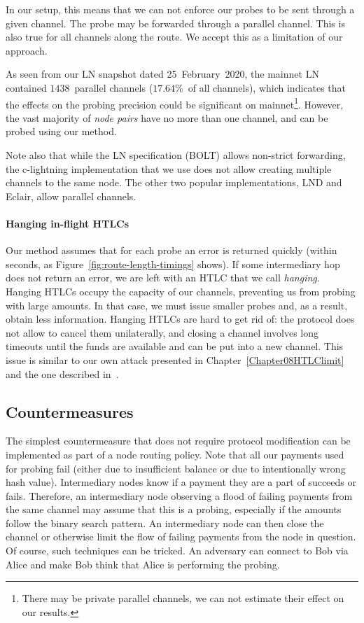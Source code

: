 In our setup, this means that we can not enforce our probes to be sent through a given channel.
The probe may be forwarded through a parallel channel.
This is also true for all channels along the route.
We accept this as a limitation of our approach.

As seen from our LN snapshot dated 25~February~2020, the mainnet LN contained $1438$~parallel channels ($17.64\%$~of all channels), which indicates that the effects on the probing precision could be significant on mainnet\footnote{There may be private parallel channels, we can not estimate their effect on our results.}.
However, the vast majority of \textit{node pairs} have no more than one channel, and can be probed using our method.

Note also that while the LN specification (BOLT) allows non-strict forwarding, the c-lightning implementation that we use does not allow creating multiple channels to the same node.
The other two popular implementations, LND and Eclair, allow parallel channels.

\paragraph{Hanging in-flight HTLCs}

Our method assumes that for each probe an error is returned quickly (within seconds, as Figure~\ref{fig:route-length-timings} shows).
If some intermediary hop does not return an error, we are left with an HTLC that we call \textit{hanging}.
Hanging HTLCs occupy the capacity of our channels, preventing us from probing with large amounts.
In that case, we must issue smaller probes and, as a result, obtain less information.
Hanging HTLCs are hard to get rid of: the protocol does not allow to cancel them unilaterally, and closing a channel involves long timeouts until the funds are available and can be put into a new channel.
This issue is similar to our own attack presented in Chapter~\ref{Chapter08HTLClimit} and the one described in~\cite{Mizrahi2020}.


\subsection{Countermeasures}

The simplest countermeasure that does not require protocol modification can be implemented as part of a node routing policy.
Note that all our payments used for probing fail (either due to insufficient balance or due to intentionally wrong hash value). 
Intermediary nodes know if a payment they are a part of succeeds or fails.
Therefore, an intermediary node observing a flood of failing payments from the same channel may assume that this is a probing, especially if the amounts follow the binary search pattern.
An intermediary node can then close the channel or otherwise limit the flow of failing payments from the node in question.
Of course, such techniques can be tricked.
An adversary can connect to Bob via Alice and make Bob think that Alice is performing the probing.

